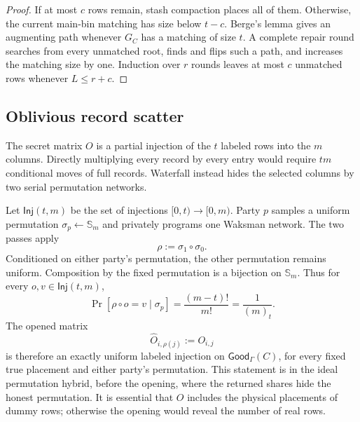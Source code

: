 \begin{proof}
If at most $c$ rows remain, stash compaction places all of them.  Otherwise,
the current main-bin matching has size below $t-c$.  Berge's lemma gives an
augmenting path whenever $G_C$ has a matching of size $t$.  A complete repair
round searches from every unmatched root, finds and flips such a path, and
increases the matching size by one.
Induction over $r$ rounds leaves at most $c$ unmatched rows whenever
$L\leq r+c$.
\end{proof}

\subsection{Oblivious record scatter}\label{sec:waterfallScatter}

The secret matrix $O$ is a partial injection of the $t$ labeled rows into the
$m$ columns.  Directly multiplying every record by every entry would require
$tm$ conditional moves of full records.  Waterfall instead hides the selected
columns by two serial permutation networks.

Let $\mathsf{Inj}(t,m)$ be the set of injections $[0,t)\to[0,m)$.  Party $p$
samples a uniform permutation $\sigma_p\gets\mathbb S_m$ and privately
programs one Waksman network.  The two passes apply
\begin{equation}\label{eq:waterfall-serial-permutation}
 \rho:=\sigma_1\circ\sigma_0.
\end{equation}
Conditioned on either party's permutation, the other permutation remains
uniform.  Composition by the fixed permutation is a bijection on
$\mathbb S_m$.  Thus for every $o,v\in\mathsf{Inj}(t,m)$,
\begin{equation}\label{eq:waterfall-opened-placement-probability}
 \Pr[\rho\circ o=v\mid\sigma_p]
 =\frac{(m-t)!}{m!}=\frac1{(m)_t}.
\end{equation}
The opened matrix
\begin{equation}\label{eq:waterfall-opened-placement}
 \widehat O_{i,\rho(j)}:=O_{i,j}
\end{equation}
is therefore an exactly uniform labeled injection on
$\mathsf{Good}_\Gamma(C)$, for every fixed true placement and either party's
permutation.  This statement is in the ideal permutation hybrid, before the
opening, where the returned shares hide the honest permutation.
It is essential that $O$ includes the physical
placements of dummy rows; otherwise the opening would reveal the number of
real rows.

